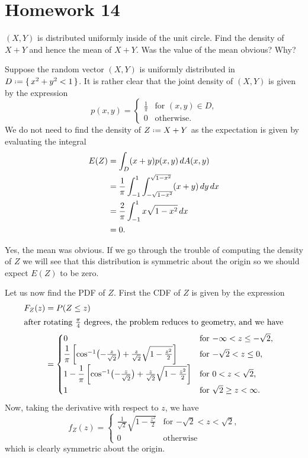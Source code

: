 \section{Homework 14}
\begin{problem}[Handout 18, \# 15]
  \((X,Y)\) is distributed uniformly inside of the unit circle. Find the
  density of \(X+Y\) and hence the mean of \(X+Y\). Was the value of the
  mean obvious? Why?
\end{problem}
\begin{solution}
  Suppose the random vector \((X,Y)\) is uniformly distributed in
  \(D\defeq \{\,x^2+y^2<1\,\}\). It is rather clear that the joint density
  of \((X,Y)\) is given by the expression
  \[
    p(x,y)=
    \begin{cases}
      \frac{1}{\pi}&\text{for \((x,y)\in D\),}\\
      0&\text{otherwise.}
    \end{cases}
  \]
  We do not need to find the density of \(Z\defeq X+Y\) as the expectation
  is given by evaluating the integral
  \begin{align*}
    E(Z)
    &=\int_D (x+y)p(x,y)\mathop{}\!d A(x,y)\\
    &=\frac{1}{\pi}\int_{-1}^1\int_{-\sqrt{1-x^2}}^{\sqrt{1-x^2}} (x+y)\mathop{}\!d
      y\mathop{}\!d x\\
    &=\frac{2}{\pi}\int_{-1}^1x\sqrt{1-x^2}\mathop{}\!d x\\
    &=0.
  \end{align*}

  Yes, the mean was obvious. If we go through the trouble of computing the
  density of \(Z\) we will see that this distribution is symmetric about
  the origin so we should expect \(E(Z)\) to be zero.

  Let us now find the PDF of \(Z\). First the CDF of \(Z\) is given by the
  expression
  \begin{align*}
    F_Z(z)
    &=P(Z\leq z)\\
    \intertext{after rotating \(\frac{\pi}{4}\) degrees, the problem
    reduces to geometry, and we have}
    &=
      \begin{cases}
        0&\text{for \(-\infty<z\leq-\sqrt{2}\),}\\
        \dfrac{1}{\pi}\left[\cos^{-1}\bigl(-\frac{z}{\sqrt{2}}\bigr)+\frac{z}{\sqrt{2}}\sqrt{1-\frac{z^2}{2}}\right]
        &\text{for \(-\sqrt{2}<z\leq 0\),}\\
        1-\dfrac{1}{\pi}\left[\cos^{-1}\bigl(-\frac{z}{\sqrt{2}}\bigr)+\frac{z}{\sqrt{2}}\sqrt{1-\frac{z^2}{2}}\right]
        &\text{for \(0<z<\sqrt{2}\),}\\
        1&\text{for \(\sqrt{2}\geq z<\infty\).}
      \end{cases}
  \end{align*}
  Now, taking the derivative with respect to \(z\), we have
  \[
    f_Z(z)=
    \begin{cases}
      \frac{1}{\sqrt{2}}\sqrt{1-\frac{z^2}{2}}&\text{for
        \(-\sqrt{2}<z<\sqrt{2}\),}\\
      0&\text{otherwise}
    \end{cases}
  \]
  which is clearly symmetric about the origin.
\end{solution}

